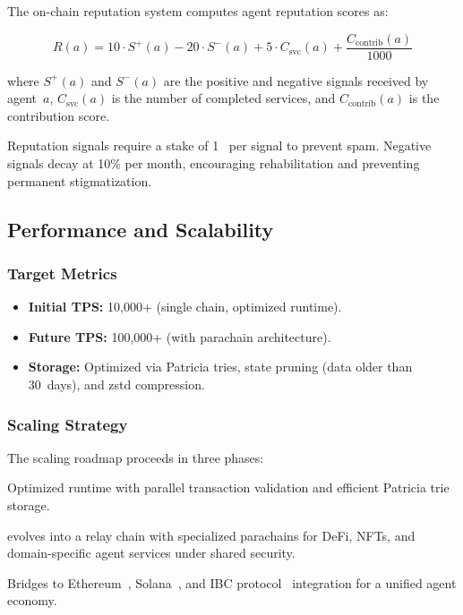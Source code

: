 The on-chain reputation system computes agent reputation scores as:

\begin{equation}
\label{eq:reputation}
    R(a) = 10 \cdot S^{+}(a) - 20 \cdot S^{-}(a) + 5 \cdot C_{\text{svc}}(a) + \frac{C_{\text{contrib}}(a)}{1000}
\end{equation}

\noindent where $S^{+}(a)$ and $S^{-}(a)$ are the positive and negative signals received by agent~$a$, $C_{\text{svc}}(a)$ is the number of completed services, and $C_{\text{contrib}}(a)$ is the contribution score.

Reputation signals require a stake of 1~\clawtoken{} per signal to prevent spam. Negative signals decay at 10\% per month, encouraging rehabilitation and preventing permanent stigmatization.

\subsection{Performance and Scalability}
\label{sec:performance}

\subsubsection{Target Metrics}

\begin{itemize}[nosep]
    \item \textbf{Initial TPS:} 10{,}000+ (single chain, optimized runtime).
    \item \textbf{Future TPS:} 100{,}000+ (with parachain architecture).
    \item \textbf{Storage:} Optimized via Patricia tries, state pruning (data older than 30~days), and zstd compression.
\end{itemize}

\subsubsection{Scaling Strategy}

The scaling roadmap proceeds in three phases:

\begin{description}[nosep]
    \item[Phase~1 --- Single Chain:] Optimized runtime with parallel transaction validation and efficient Patricia trie storage.
    \item[Phase~2 --- Parachains:] \claw{} evolves into a relay chain with specialized parachains for DeFi, NFTs, and domain-specific agent services under shared security.
    \item[Phase~3 --- Cross-Chain:] Bridges to Ethereum~\citep{ethereum2014}, Solana~\citep{solana2020}, and IBC protocol~\citep{ibc2019} integration for a unified agent economy.
\end{description}

